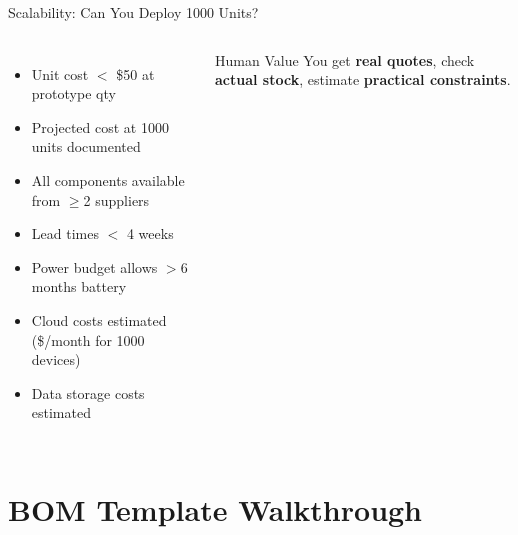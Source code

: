 \documentclass[aspectratio=169,11pt]{beamer}
\begin{document}
\begin{frame}[shrink=10]{Scalability: Can You Deploy 1000 Units?}
\begin{columns}
{\begin{minipage}{0.9\textwidth}
            \vspace{0.1cm}
            \begin{itemize}
                \item[$\square$] Unit cost $<$ \$50 at prototype qty
                \item[$\square$] Projected cost at 1000 units documented
                \item[$\square$] All components available from $\geq$2 suppliers
                \item[$\square$] Lead times $<$ 4 weeks
                \item[$\square$] Power budget allows $>$6 months battery
                \item[$\square$] Cloud costs estimated (\$/month for 1000 devices)
                \item[$\square$] Data storage costs estimated
            \end{itemize}
            \vspace{0.2cm}
        \end{minipage}
        }
        
        \vspace{0.15cm}
        \begin{alertblock}{Human Value}
            \small
            You get \textbf{real quotes}, check \textbf{actual stock}, estimate \textbf{practical constraints}.
        \end{alertblock}
        
        \vspace{0.1cm}
    \end{columns}
\end{frame}

\section{BOM Template Walkthrough}
\end{document}
